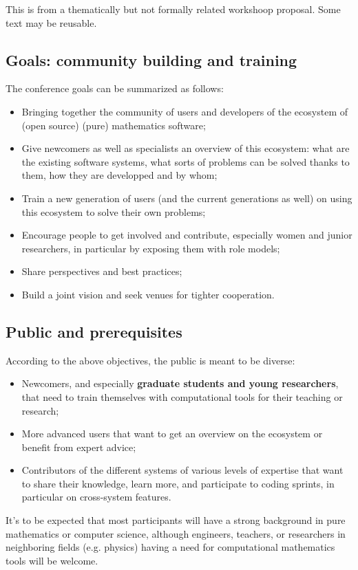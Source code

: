 \begin{oldpart}{This is from a thematically but not formally related workshoop proposal. Some text may be reusable.}
\subsection{Goals: community building and training}

The conference goals can be summarized as follows:

\begin{itemize}
\item Bringing together the community of users and developers of the
  ecosystem of (open source) (pure) mathematics software;
\item Give newcomers as well as specialists an overview of this
  ecosystem: what are the existing software systems, what sorts of
  problems can be solved thanks to them, how they are developped and
  by whom;
\item Train a new generation of users (and the current generations as
  well) on using this ecosystem to solve their own problems;
\item Encourage people to get involved and contribute, especially
  women and junior researchers, in particular by exposing them with role models;
\item Share perspectives and best practices;
\item Build a joint vision and
  seek venues for tighter cooperation.
\end{itemize}

\subsection{Public and prerequisites}

According to the above objectives, the public is meant to be diverse:
\begin{itemize}
\item Newcomers, and especially \textbf{graduate students and young
    researchers}, that need to train themselves with computational
  tools for their teaching or research;
\item More advanced users that want to get an overview on the
  ecosystem or benefit from expert advice;
\item Contributors of the different systems of various levels of
  expertise that want to share their knowledge, learn more, and
  participate to coding sprints, in particular on cross-system
  features.
\end{itemize}

It's to be expected that most participants will have a strong
background in pure mathematics or computer science, although
engineers, teachers, or researchers in neighboring fields (e.g. physics)
having a need for computational mathematics tools will be
welcome.


\end{oldpart}
